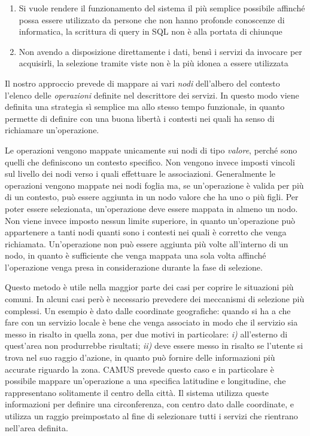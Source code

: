 \begin{enumerate}
	\item
	Si vuole rendere il funzionamento del sistema il più semplice possibile affinché possa essere utilizzato da persone che non hanno profonde conoscenze di informatica, la scrittura di query in SQL non è alla portata di chiunque
	\item
	Non avendo a disposizione direttamente i dati, bensì i servizi da invocare per acquisirli, la selezione tramite viste non è la più idonea a essere utilizzata
\end{enumerate}

Il nostro approccio prevede di mappare ai vari \emph{nodi} dell'albero del contesto l'elenco delle \emph{operazioni} definite nel descrittore dei servizi. In questo modo viene definita una strategia sì semplice ma allo stesso tempo funzionale, in quanto permette di definire con una buona libertà i contesti nei quali ha senso di richiamare un'operazione.

Le operazioni vengono mappate unicamente sui nodi di tipo \emph{valore}, perché sono quelli che definiscono un contesto specifico. Non vengono invece imposti vincoli sul livello dei nodi verso i quali effettuare le associazioni. Generalmente le operazioni vengono mappate nei nodi foglia ma, se un'operazione è valida per più di un contesto, può essere aggiunta in un nodo valore che ha uno o più figli. Per poter essere selezionata, un'operazione deve essere mappata in almeno un nodo. Non viene invece imposto nessun limite superiore, in quanto un'operazione può appartenere a tanti nodi quanti sono i contesti nei quali è corretto che venga richiamata. Un'operazione non può essere aggiunta più volte all'interno di un nodo, in quanto è sufficiente che venga mappata una sola volta affinché l'operazione venga presa in considerazione durante la fase di selezione.

Questo metodo è utile nella maggior parte dei casi per coprire le situazioni più comuni. In alcuni casi però è necessario prevedere dei meccanismi di selezione più complessi. Un esempio è dato dalle coordinate geografiche: quando si ha a che fare con un servizio locale è bene che venga associato in modo che il servizio sia messo in risalto in quella zona, per due motivi in particolare: \emph{i)} all'esterno di quest'area non produrrebbe risultati; \emph{ii)} deve essere messo in risalto se l'utente si trova nel suo raggio d'azione, in quanto può fornire delle informazioni più accurate riguardo la zona. CAMUS prevede questo caso e in particolare è possibile mappare un'operazione a una specifica latitudine e longitudine, che rappresentano solitamente il centro della città. Il sistema utilizza queste informazioni per definire una circonferenza, con centro dato dalle coordinate, e utilizza un raggio preimpostato al fine di selezionare tutti i servizi che rientrano nell'area definita.

